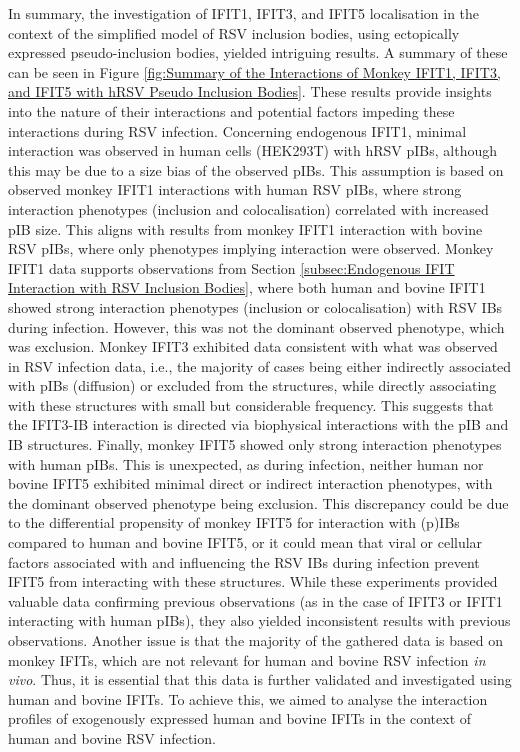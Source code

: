 In summary, the investigation of IFIT1, IFIT3, and IFIT5 localisation in the context of the simplified model of RSV inclusion bodies, using ectopically expressed pseudo-inclusion bodies, yielded intriguing results. A summary of these can be seen in Figure \ref{fig:Summary of the Interactions of Monkey IFIT1, IFIT3, and IFIT5 with hRSV Pseudo Inclusion Bodies}. These results provide insights into the nature of their interactions and potential factors impeding these interactions during RSV infection. Concerning endogenous IFIT1, minimal interaction was observed in human cells (HEK293T) with hRSV pIBs, although this may be due to a size bias of the observed pIBs. This assumption is based on observed monkey IFIT1 interactions with human RSV pIBs, where strong interaction phenotypes (inclusion and colocalisation) correlated with increased pIB size. This aligns with results from monkey IFIT1 interaction with bovine RSV pIBs, where only phenotypes implying interaction were observed. Monkey IFIT1 data supports observations from Section \ref{subsec:Endogenous IFIT Interaction with RSV Inclusion Bodies}, where both human and bovine IFIT1 showed strong interaction phenotypes (inclusion or colocalisation) with RSV IBs during infection. However, this was not the dominant observed phenotype, which was exclusion. Monkey IFIT3 exhibited data consistent with what was observed in RSV infection data, i.e., the majority of cases being either indirectly associated with pIBs (diffusion) or excluded from the structures, while directly associating with these structures with small but considerable frequency. This suggests that the IFIT3-IB interaction is directed via biophysical interactions with the pIB and IB structures. Finally, monkey IFIT5 showed only strong interaction phenotypes with human pIBs. This is unexpected, as during infection, neither human nor bovine IFIT5 exhibited minimal direct or indirect interaction phenotypes, with the dominant observed phenotype being exclusion. This discrepancy could be due to the differential propensity of monkey IFIT5 for interaction with (p)IBs compared to human and bovine IFIT5, or it could mean that viral or cellular factors associated with and influencing the RSV IBs during infection prevent IFIT5 from interacting with these structures. While these experiments provided valuable data confirming previous observations (as in the case of IFIT3 or IFIT1 interacting with human pIBs), they also yielded inconsistent results with previous observations. Another issue is that the majority of the gathered data is based on monkey IFITs, which are not relevant for human and bovine RSV infection \textit{in vivo}. Thus, it is essential that this data is further validated and investigated using human and bovine IFITs. To achieve this, we aimed to analyse the interaction profiles of exogenously expressed human and bovine IFITs in the context of human and bovine RSV infection.

